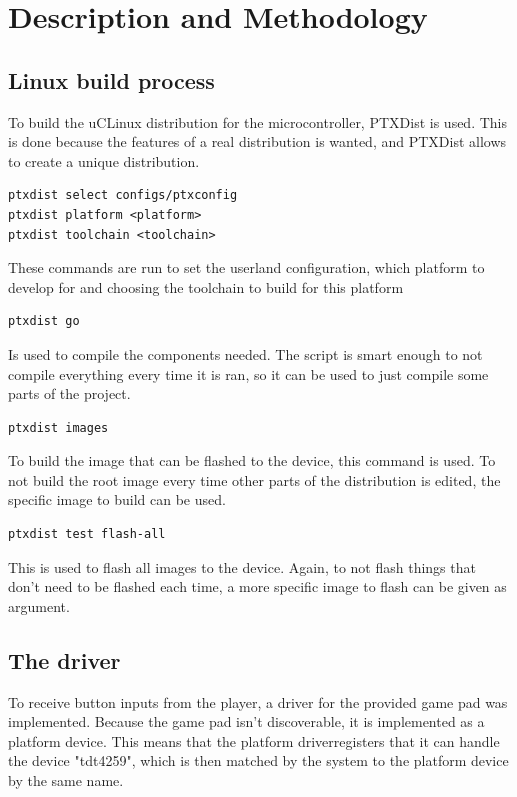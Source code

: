 \section{Description and Methodology}

\subsection{Linux build process}
To build the uCLinux distribution for the microcontroller, PTXDist is
used\cite{ptxdistguru}. This is done because the features of a real
distribution is wanted, and PTXDist allows to create a unique distribution.

\begin{verbatim}
ptxdist select configs/ptxconfig
ptxdist platform <platform>
ptxdist toolchain <toolchain>
\end{verbatim}

\noindent
These commands are run to set the userland configuration, which platform to
develop for and choosing the toolchain to build for this platform

\begin{verbatim}
ptxdist go
\end{verbatim}

\noindent
Is used to compile the components needed. The script is smart enough to not
compile everything every time it is ran, so it can be used to just compile
some parts of the project.

\begin{verbatim}
ptxdist images
\end{verbatim}

\noindent
To build the image that can be flashed to the device, this command is used. To
not build the root image every time other parts of the distribution is edited,
the specific image to build can be used.

\begin{verbatim}
ptxdist test flash-all
\end{verbatim}

\noindent
This is used to flash all images to the device. Again, to not flash things that
don't need to be flashed each time, a more specific image to flash can be given
as argument.


\subsection{The driver}

To receive button inputs from the player, a driver for the provided game pad was
implemented. Because the game pad isn't discoverable, it is implemented as a
platform device. This means that the platform driver\footnotemark registers
that it can handle the device "tdt4259", which is then matched by the system to
the platform device by the same name.

